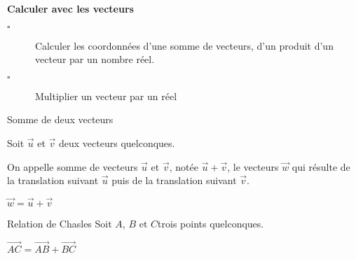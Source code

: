 \begin{titre}

\end{titre}

\begin{CpsCol}
\textbf{Calculer avec les vecteurs}
\begin{description}
\item[$\square$] Calculer les coordonnées d’une somme de vecteurs, d’un produit d’un vecteur par un
nombre réel.
\item[$\square$] Multiplier un vecteur par un réel
\end{description}
\end{CpsCol}




\begin{DefT}{Somme de deux vecteurs}
\begin{minipage}{0.48\linewidth}
Soit $\overrightarrow{u}$ et $\overrightarrow{v}$ deux vecteurs quelconques.

On appelle somme de vecteurs $\overrightarrow{u}$ et $\overrightarrow{v}$, notée $\overrightarrow{u}+\overrightarrow{v}$, le vecteurs $\overrightarrow{w}$ qui résulte de la translation suivant $\overrightarrow{u}$ puis de la translation suivant $\overrightarrow{v}$.
\end{minipage}
\hfill
\begin{minipage}{0.48\linewidth}
\end{minipage}
\end{DefT}


\begin{Nt}
$\overrightarrow{w}=\overrightarrow{u}+\overrightarrow{v}$
\end{Nt}





\begin{DefT}{Relation de Chasles}
Soit $A$, $B$ et $C$trois points quelconques.

$\overrightarrow{AC}=\overrightarrow{AB}+\overrightarrow{BC}$
\end{DefT}

